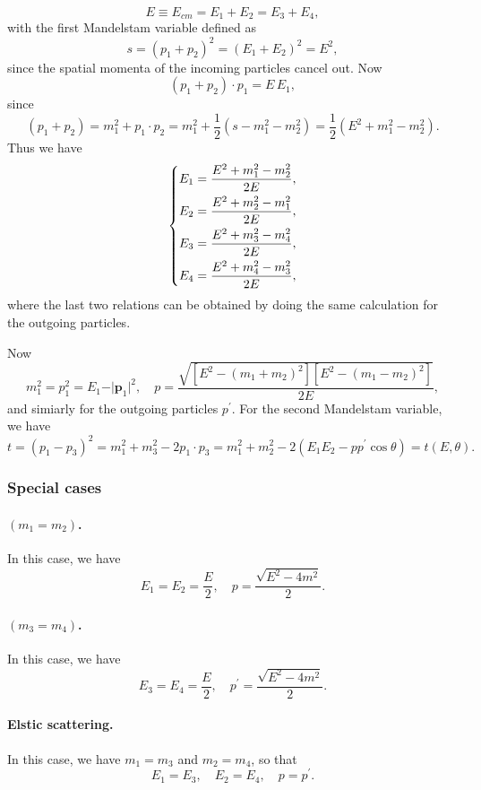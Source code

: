 \[
    E \equiv E_{cm} = E_1 + E_2 = E_3 + E_4,
\]
with the first Mandelstam variable defined as
\[
    s = (p_1 + p_2)^2 = (E_1 + E_2)^2 = E^2,
\]
since the spatial momenta of the incoming particles cancel out. Now
\[
    (p_1 + p_2) \cdot p_1 = E \, E_1,
\]
since
\[
    (p_1 + p_2) = m_1^2 + p_1 \cdot p_2 = m_1^2 + \frac{1}{2}(s - m_1^2 - m_2^2) = \frac{1}{2}(E^2 + m_1^2 - m_2^2).
\]
Thus we have
\[
    \begin{dcases}
        E_1 = \frac{E^2 + m_1^2 - m_2^2}{2E}, \\
        E_2 = \frac{E^2 + m_2^2 - m_1^2}{2E}, \\
        E_3 = \frac{E^2 + m_3^2 - m_4^2}{2E}, \\
        E_4 = \frac{E^2 + m_4^2 - m_3^2}{2E},
    \end{dcases}
\]
where the last two relations can be obtained by doing the same calculation for the outgoing particles.

Now
\[
    m_1^2 = p_1^2 = E_1 - \vert \mathbf{p}_1 \vert^2, \quad p = \frac{\sqrt{\left[E^2 - (m_1 + m_2)^2\right]\left[E^2 - (m_1 - m_2)^2\right]}}{2E},
\]
and simiarly for the outgoing particles \(p^{\prime}\). For the second Mandelstam variable, we have
\[
    t = (p_1 - p_3)^2 = m_1^2 + m_3^2 - 2 p_1 \cdot p_3 = m_1^2 + m_2^2 - 2(E_1 E_2 - p p^{\prime} \cos \theta) = t(E, \theta).
\]

\subsubsection{Special cases}

\paragraph{\((m_1 = m_2)\).} In this case, we have
\[
    E_1 = E_2 = \frac{E}{2}, \quad p = \frac{\sqrt{E^2 - 4 m^2}}{2}.
\]

\paragraph{\((m_3 = m_4)\).} In this case, we have
\[
    E_3 = E_4 = \frac{E}{2}, \quad p^{\prime} = \frac{\sqrt{E^2 - 4 m^2}}{2}.
\]

\paragraph{Elstic scattering.} In this case, we have \(m_1 = m_3\) and \(m_2 = m_4\), so that
\[
    E_1 = E_3, \quad E_2 = E_4, \quad p = p^{\prime}.
\]

